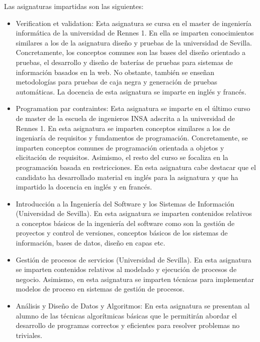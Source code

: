 Las asignaturas impartidas son las siguientes:
\begin{itemize}
\item Verification et validation: Esta asignatura se cursa en el master de ingeniería informática de la universidad de Rennes 1. En ella se imparten conocimientos similares a los de la asignatura diseño y pruebas de la universidad de Sevilla. Concretamente, los conceptos comunes son las bases del diseño orientado a pruebas, el desarrollo y diseño de baterías de pruebas para sistemas de información basados en la web. No obstante, también se enseñan metodologías para pruebas de caja negra y generación de pruebas automáticas. La docencia de esta asignatura se imparte en inglés y francés.
\item Programation par contraintes: Esta asignatura se imparte en el último curso de master de la escuela de ingenieros INSA adscrita a la universidad de Rennes 1. En esta asignatura se imparten conceptos similares a los de ingeniaría de requisitos y fundamentos de programación. Concretamente, se imparten conceptos comunes de programación orientada a objetos y elicitación de requisitos. Asimismo, el resto del curso se focaliza en la programación basada en restricciones. En esta asignatura cabe destacar que el candidato ha desarrollado material en inglés para la asignatura y que ha impartido la docencia en inglés y en francés.
\item Introducción a la Ingeniería del Software y los Sistemas de Información (Universidad de Sevilla). En esta asignatura se imparten contenidos relativos a conceptos básicos de la ingeniería del software como son la gestión de proyectos y control de versiones, conceptos básicos de los sistemas de información, bases de datos, diseño en capas etc. 
\item Gestión de procesos de servicios (Universidad de Sevilla). En esta asignatura se imparten contenidos relativos al modelado y ejecución de procesos de negocio. Asimismo, en esta asignatura se imparten técnicas para implementar modelos de proceso en sistemas de gestión de procesos. 
\item Análisis y Diseño de Datos y Algoritmos: En esta asignatura se presentan al alumno de las técnicas algorítmicas básicas que le permitirán abordar el desarrollo de programas correctos y eficientes para resolver problemas no triviales. 
\end{itemize}